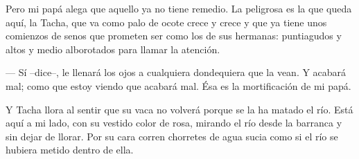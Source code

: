 \begin{pages}
\begin{Leftside}
		\pend

		\pstart
			Pero mi papá alega que aquello ya no tiene remedio. La peligrosa es la que queda aquí, la Tacha, que va como palo de ocote crece y crece y que ya tiene unos comienzos de senos que prometen ser como los de sus hermanas: puntiagudos y altos y medio alborotados para llamar la atención.

		\pend

		\pstart
			--- Sí --dice--, le llenará los ojos a cualquiera dondequiera que la vean. Y acabará mal;
			como que estoy viendo que acabará mal. Ésa es la mortificación de mi papá.
		\pend

		\pstart
			Y Tacha llora al sentir que su vaca no volverá porque se la ha matado el río. Está aquí a mi lado, con su vestido color de rosa, mirando el río desde la barranca y sin dejar de llorar. Por su cara corren chorretes de agua sucia como si el río se hubiera metido dentro de ella.
		\pend


\end{Leftside}
\end{pages}
